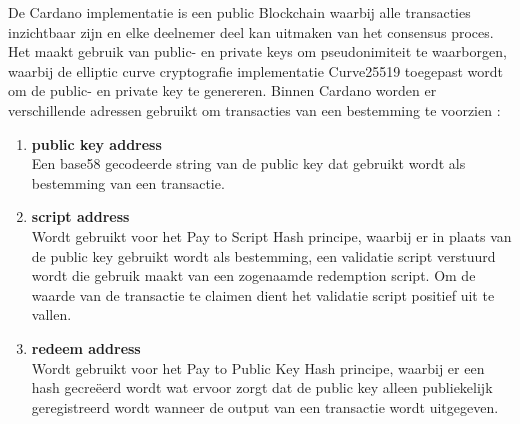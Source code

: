 De Cardano implementatie is een public Blockchain waarbij alle transacties inzichtbaar zijn en elke deelnemer deel kan uitmaken van het consensus proces. Het maakt gebruik van public- en private keys om pseudonimiteit te waarborgen, waarbij de elliptic curve cryptografie implementatie Curve25519 toegepast wordt om de public- en private key te genereren. Binnen Cardano worden er verschillende adressen gebruikt om transacties van een bestemming te voorzien \citep[''Addresses in Cardano SL'']{cardano_wiki}:

\begin{enumerate}
  \item \textbf{public key address}
  \\ Een base58 gecodeerde string van de public key dat gebruikt wordt als bestemming van een transactie.
  \item \textbf{script address}
  \\ Wordt gebruikt voor het Pay to Script Hash principe, waarbij er in plaats van de public key gebruikt wordt als bestemming, een validatie script verstuurd wordt die gebruik maakt van een zogenaamde redemption script. Om de waarde van de transactie te claimen dient het validatie script positief uit te vallen.
  \item \textbf{redeem address}
  \\ Wordt gebruikt voor het Pay to Public Key Hash principe, waarbij er een hash gecreëerd wordt wat ervoor zorgt dat de public key alleen publiekelijk geregistreerd wordt wanneer de output van een transactie wordt uitgegeven.
\end{enumerate}
